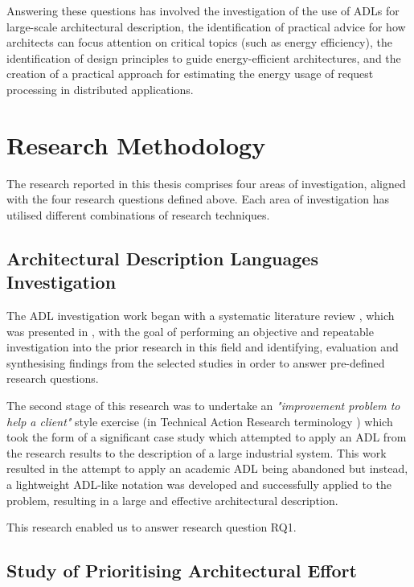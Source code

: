 Answering these questions has involved the investigation of the use of ADLs for large-scale architectural description, the identification of practical advice for how architects can focus attention on critical topics (such as energy efficiency), the identification of design principles to guide energy-efficient architectures, and the creation of a practical approach for estimating the energy usage of request processing in distributed applications.

\section{Research Methodology}

The research reported in this thesis comprises four areas of investigation, aligned with the four research questions defined above.  Each area of investigation has utilised different combinations of research techniques.

\subsection{Architectural Description Languages Investigation}

The ADL investigation work began with a systematic literature review \cite{kitchenham2007-slr}, which was presented in , with the goal of performing an objective and repeatable investigation into the prior research in this field and identifying, evaluation and synthesising findings from the selected studies in order to answer pre-defined research questions.  

The second stage of this research was to undertake an \emph{"improvement problem to help a client"} style exercise (in Technical Action Research terminology \cite{wieringa2012-tar}) which took the form of a significant case study which attempted to apply an ADL from the research results to the description of a large industrial system.  This work resulted in the attempt to apply an academic ADL being abandoned but instead, a lightweight ADL-like notation was developed and successfully applied to the problem, resulting in a large and effective architectural description.

This research enabled us to answer research question RQ1.

\subsection{Study of Prioritising Architectural Effort}

